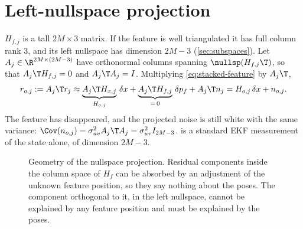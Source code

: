 \section{Left-nullspace projection}

$H_{f,j}$ is a tall $2M\times3$ matrix. If the feature is well triangulated it has full column rank 3, and its left nullspace
has dimension $2M - 3$ (\cref{sec:subspaces}). Let $A_j \in \R^{2M\times(2M-3)}$ have orthonormal columns spanning
$\nullsp(H_{f,j}\T)$, so that $A_j\T H_{f,j} = 0$ and $A_j\T A_j = I$. Multiplying \eqref{eq:stacked-feature} by $A_j\T$,
\begin{equation}
  r_{o,j} := A_j\T r_j \approx \underbrace{A_j\T H_{x,j}}_{H_{o,j}}\,\delta x + \underbrace{A_j\T H_{f,j}}_{=\,0}\,\delta p_f + A_j\T n_j
  = H_{o,j}\,\delta x + n_{o,j} .
  \label{eq:projected}
\end{equation}
The feature has disappeared, and the projected noise is still white with the same variance:
$\Cov(n_{o,j}) = \sigma_{uv}^2A_j\T A_j = \sigma_{uv}^2 I_{2M-3}$.  is a standard EKF measurement of the state alone,
of dimension $2M - 3$.

\begin{figure}[t]
\centering
{}
\caption{Geometry of the nullspace projection. Residual components inside the column space of $H_f$ can be absorbed by an
adjustment of the unknown feature position, so they say nothing about the poses. The component orthogonal to it, in the
left nullspace, cannot be explained by any feature position and must be explained by the poses.}
\label{fig:nullspace}
\end{figure}

